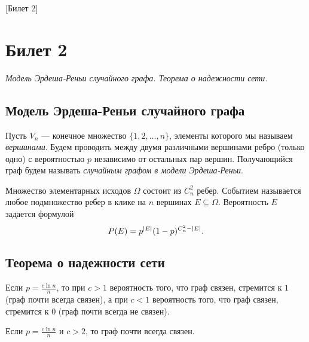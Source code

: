 [Билет 2]

\section{Билет 2}

\begin{center}
    \it Модель Эрдеша-Реньи случайного графа.
    Теорема о надежности сети.
\end{center}

\sectionbreak
\subsection{Модель Эрдеша-Реньи случайного графа}

\begin{definition*}
    Пусть $V_n$ --- конечное множество $\{1, 2, \ldots, n\}$, элементы которого мы называем {\it вершинами}.
    Будем проводить между двумя различными вершинами ребро (только одно) с вероятностью $p$ независимо от остальных пар вершин.
    Получающийся граф будем называть {\it случайным графом в модели Эрдеша-Реньи}.
\end{definition*}

Множество элементарных исходов $\Omega$ состоит из $C_n^2$ ребер.
Событием называется любое подмножество ребер в клике на $n$ вершинах $E \subseteq \Omega$.
Вероятность $E$ задается формулой
\[
    P(E) = p^{\abs{E}}(1 - p)^{C_n^2 - \abs{E}}.
\]

\sectionbreak
\subsection{Теорема о надежности сети}

\begin{theorem*}
    Если $p = \frac{c \ln n}{n}$, то при $c > 1$ вероятность того, что граф связен, стремится к $1$ (граф почти всегда связен), а при $c < 1$ вероятность того, что граф связен, стремится к $0$ (граф почти всегда не связен).
\end{theorem*}

\begin{theorem*}
    Если $p = \frac{c \ln n}{n}$ и $c > 2$, то граф почти всегда связен.
\end{theorem*}

